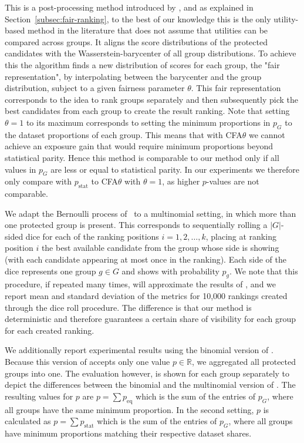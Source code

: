  This is a post-processing method introduced by \citet{zehlike2020matching}, and as explained in Section~\ref{subsec:fair-ranking}, to the best of our knowledge this is the only utility-based method in the literature that does not assume that utilities can be compared across groups.
%
It aligns the score distributions of the protected candidates with the Wasserstein-barycenter of all group distributions.
%
To achieve this the algorithm finds a new distribution of scores for each group, the "fair representation", by interpolating between the barycenter and the group distribution, subject to a given fairness parameter $\theta$.
%
This fair representation corresponds to the idea to rank groups separately and then subsequently pick the best candidates from each group to create the result ranking.
%
Note that setting $\theta=1$ to its maximum corresponds to setting the minimum proportions in $p_G$ to the dataset proportions of each group.
%
This means that with CFA$\theta$ we cannot achieve an exposure gain that would require minimum proportions beyond statistical parity.
%
Hence this method is comparable to our method only if all values in $p_G$ are less or equal to statistical parity.
%
In our experiments we therefore only compare \algoFAIR with $p_{\text{stat}}$ to CFA$\theta$ with $\theta=1$, as higher $p$-values are not comparable.

 We adapt the Bernoulli process of~\citet{yang2016measuring} to a multinomial setting, in which more than one protected group is present.
%
This corresponds to sequentially rolling a $|G|$-sided dice for each of the ranking positions $i=1, 2, \dots, k$, placing at ranking position $i$ the best available candidate from the group whose side is showing (with each candidate appearing at most once in the ranking).
%
Each side of the dice represents one group $g \in G$ and shows with probability $p_g$.
%
We note that this procedure, if repeated many times, will approximate the results of \algoFAIR, and we report mean and standard deviation of the metrics for 10,000 rankings created through the dice roll procedure. 
%
The difference is that our method is deterministic and therefore guarantees a certain share of visibility for each group for each created ranking.

 We additionally report experimental results using the binomial version of \algoFAIR \citep{zehlike2017fair, zehlike2020fairsearch}. 
%
Because this version of \algoFAIR accepts only one value $p \in \mathbb{R}$, we aggregated all protected groups into one. 
%
The evaluation however, is shown for each group separately to depict the differences between the binomial and the multinomial version of \algoFAIR. 
%
The resulting values for $p$ are $p=\sum p_{\text{eq}}$ which is the sum of the entries of $p_G$, where all groups have the same minimum proportion. 
%
In the second setting, $p$ is calculated as $p=\sum p_{\text{stat}}$ which is the sum of the entries of $p_G$, where all groups have minimum proportions matching their respective dataset shares. 

